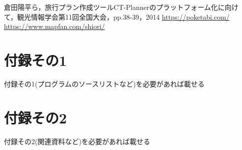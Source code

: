 \documentclass{funthesis}
\begin{document}



\begin{thebibliography}{9}
  倉田陽平ら，旅行プラン作成ツールCT-Plannerのプラットフォーム化に向けて，観光情報学会第11回全国大会，pp.38-39，2014
  {\url{https://poketabi.com/}}
  {\url{https://www.mapfan.com/shiori/}}
\end{thebibliography}


\appendix

\chapter*{付録その1} %

付録その1(プログラムのソースリストなど)を必要があれば載せる

\chapter*{付録その2}

付録その2(関連資料など)を必要があれば載せる

\listoffigures

\listoftables
\end{document}
